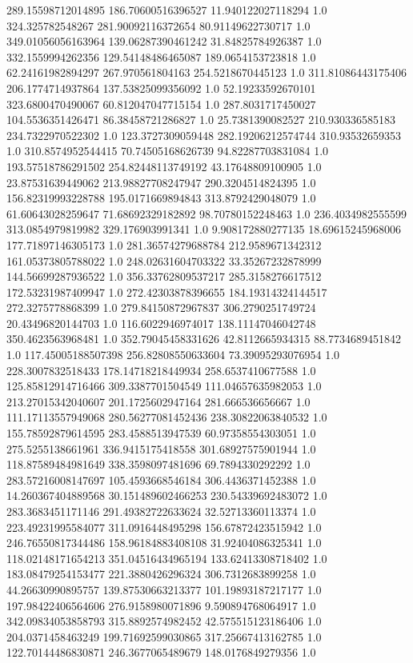 289.15598712014895	186.70600516396527	11.940122027118294	1.0
324.325782548267	281.90092116372654	80.91149622730717	1.0
349.01056056163964	139.06287390461242	31.84825784926387	1.0
332.1559994262356	129.54148486465087	189.0654153723818	1.0
62.24161982894297	267.970561804163	254.5218670445123	1.0
311.81086443175406	206.1774714937864	137.53825099356092	1.0
52.19233592670101	323.6800470490067	60.812047047715154	1.0
287.8031717450027	104.5536351426471	86.38458721286827	1.0
25.7381390082527	210.930336585183	234.7322970522302	1.0
123.3727309059448	282.19206212574744	310.93532659353	1.0
310.8574952544415	70.74505168626739	94.82287703831084	1.0
193.57518786291502	254.82448113749192	43.17648809100905	1.0
23.87531639449062	213.98827708247947	290.3204514824395	1.0
156.82319993228788	195.0171669894843	313.8792429048079	1.0
61.60643028259647	71.68692329182892	98.70780152248463	1.0
236.4034982555599	313.0854979819982	329.176903991341	1.0
9.908172880277135	18.69615245968006	177.71897146305173	1.0
281.36574279688784	212.9589671342312	161.05373805788022	1.0
248.02631604703322	33.35267232878999	144.56699287936522	1.0
356.33762809537217	285.3158276617512	172.53231987409947	1.0
272.42303878396655	184.19314324144517	272.3275778868399	1.0
279.84150872967837	306.2790251749724	20.43496820144703	1.0
116.6022946974017	138.11147046042748	350.4623563968481	1.0
352.79045458331626	42.8112665934315	88.7734689451842	1.0
117.45005188507398	256.82808550633604	73.39095293076954	1.0
228.3007832518433	178.14718218449934	258.6537410677588	1.0
125.85812914716466	309.3387701504549	111.04657635982053	1.0
213.27015342040607	201.1725602947164	281.666536656667	1.0
111.17113557949068	280.56277081452436	238.30822063840532	1.0
155.78592879614595	283.4588513947539	60.97358554303051	1.0
275.5255138661961	336.9415175418558	301.68927575901944	1.0
118.87589484981649	338.3598097481696	69.7894330292292	1.0
283.57216008147697	105.4593668546184	306.4436371452388	1.0
14.260367404889568	30.151489602466253	230.54339692483072	1.0
283.3683451171146	291.49382722633624	32.52713360113374	1.0
223.49231995584077	311.0916448495298	156.67872423515942	1.0
246.76550817344486	158.96184883408108	31.92404086325341	1.0
118.02148171654213	351.04516434965194	133.62413308718402	1.0
183.08479254153477	221.3880426296324	306.7312683899258	1.0
44.26630990895757	139.87530663213377	101.19893187217177	1.0
197.98422406564606	276.9158980071896	9.590894768064917	1.0
342.09834053858793	315.8892574982452	42.575515123186406	1.0
204.0371458463249	199.71692599030865	317.25667413162785	1.0
122.70144486830871	246.3677065489679	148.0176849279356	1.0
